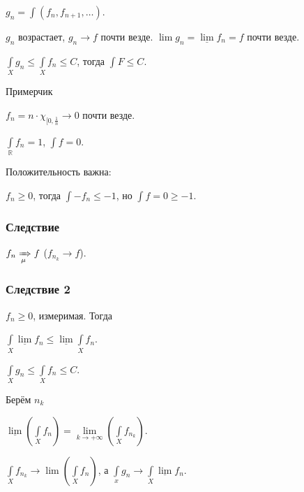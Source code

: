 \documentclass{article}
\begin{document}
                $g_n = \int (f_n, f_{n + 1}, \ldots)$.
                
                $g_n$ возрастает, $g_n \rightarrow f$ почти везде. $\lim g_n = \underline{\lim} f_n = f$ почти везде.
                
                $\int\limits_X g_n \leqslant \int\limits_X f_n \leqslant C$, тогда $\int F \leqslant C$.
                
            Примерчик
            
            $f_n = n \cdot \chi_{[0, \frac{1}{n}} \rightarrow 0$ почти везде.
            
            $\int\limits_{\mathbb{R}} f_n = 1$, $\int f = 0$.
            
            Положительность важна:
            
            $f_n \geqslant 0$, тогда $\int -f_n \leqslant -1$, но $\int f = 0 \geqslant -1$.
            
            \subsubsection{Следствие}
            
                $f_n \xRightarrow[\mu]{} f$ ($f_{n_k} \rightarrow f$).
                
            \subsubsection{Следствие 2}
            
                $f_n \geqslant 0$, измеримая. Тогда
                
                $\int\limits_X \underline{\lim} f_n \leqslant \underline{\lim} \int\limits_X f_n$.
                
                
                    $\int\limits_X g_n \leqslant \int\limits_X f_n \leqslant C$.
                
                    Берём $n_k$
                    
                    $\underline{\lim} \left( \int\limits_X f_n \right) = \lim\limits_{k \rightarrow +\infty} \left( \int\limits_X f_{n_k} \right)$.
                    
                    $\int\limits_X f_{n_k} \rightarrow \lim \left( \int\limits_X f_n \right)$, а $\int\limits_x g_n \rightarrow \int\limits_X \underline{\lim} f_n$.
\newpage
\end{document}
